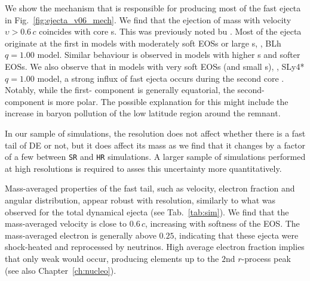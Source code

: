 We show the mechanism that is responsible for producing most of the fast ejecta in 
Fig.~\ref{fig:ejecta_v06_mech}. We find that the 
ejection of mass with velocity $\upsilon>0.6\,c$ coincides with core \bnc{}s. 
This was previously noted bu \citet{Radice:2018pdn}.
Most of the ejecta originate at the first \bnc{} in models with moderately soft \acp{EOS} 
or large \mr{}s, \eg, BLh $q=1.00$ model. %
Similar behaviour is observed in models with higher \mr{}s and softer \acp{EOS}. 
We also observe that in models with very soft \acp{EOS} 
(and small \mr{}s), \eg, SLy4* $q=1.00$ model, a strong influx of fast ejecta 
occurs during the second core \bnc{}.
Notably, while the first-\bnc{} component is generally equatorial, 
the second-\bnc{} component is more polar. The possible explanation for this might 
include the increase in baryon pollution of the low latitude region around 
the \pmerg{} remnant.

In our sample of simulations, the resolution does not affect whether there is a fast tail 
of \ac{DE} or not, but it does affect its mass %
as we find that  
it changes by a factor of a few
between \texttt{SR} and \texttt{HR} simulations. 
A larger sample of simulations performed at high resolutions
is required to asses this uncertainty more quantitatively.


Mass-averaged properties of the fast tail, such as velocity, electron fraction and 
angular distribution, appear robust with resolution, similarly to what was observed for 
the total dynamical ejecta (see Tab.~\ref{tab:sim}).
%
We find that the mass-averaged velocity %
is close to $0.6\,c$,
increasing with softness of the \ac{EOS}.
%
The mass-averaged electron
is generally above $0.25$, 
indicating that these ejecta were shock-heated and reprocessed by neutrinos. High 
average electron fraction implies that only weak \rproc{} \nuc{} would 
occur, producing elements up to the $2$nd $r$-process peak \citep{Lippuner:2015gwa} 
(see also Chapter~\ref{ch:nucleo}).


